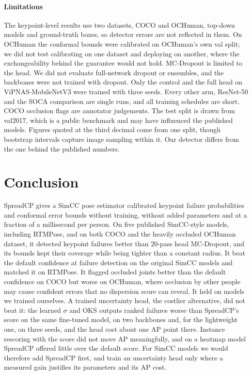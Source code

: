 \documentclass[preprint,11pt]{elsarticle}
\newcommand{\method}{SpreadCP}
\begin{document}
\paragraph{Limitations} The keypoint-level results use two datasets, COCO and OCHuman, top-down models
and ground-truth boxes, so detector errors are not reflected in them. On OCHuman the conformal bounds
were calibrated on OCHuman's own val split; we did not test calibrating on one dataset and deploying
on another, where the exchangeability behind the guarantee would not hold. MC-Dropout is limited to the head.
We did not evaluate full-network dropout or ensembles, and the backbones were not trained with
dropout. Only the control and the full head on ViPNAS-MobileNetV3 were trained with three seeds. Every
other arm, ResNet-50 and the SOCA comparison are single runs, and all training schedules are short.
COCO occlusion flags are annotator judgements. The test split is drawn from val2017, which
is a public benchmark and may have influenced the published models. Figures quoted at the third decimal
come from one split, though bootstrap intervals capture image sampling within it. Our detector differs
from the one behind the published numbers.

\section{Conclusion}

\method{} gives a SimCC pose estimator calibrated keypoint failure probabilities and conformal error
bounds without training, without added parameters and at a fraction of a millisecond per person. On
five published SimCC-style models, including RTMPose, and on both COCO and the heavily occluded OCHuman
dataset, it detected keypoint failures better than 20-pass head MC-Dropout, and its bounds kept their
coverage while being tighter than a constant radius. It beat the default confidence at failure
detection on the original SimCC models and matched it on RTMPose. It flagged occluded joints better than
the default confidence on COCO but worse on OCHuman, where occlusion by other people may cause confident
errors that no dispersion score can reveal. It held on models we trained ourselves. A trained uncertainty head, the costlier alternative, did not beat it: the learned
$\sigma$ and OKS outputs ranked failures worse than \method{}'s score on the same fine-tuned model, on two
backbones and, for the lightweight one, on three seeds, and the head cost about one AP point there.
Instance rescoring with the score did not move AP meaningfully, and on a heatmap model \method{} offered
little over the default score. For SimCC models we would therefore add \method{} first, and train an
uncertainty head only where a measured gain justifies its parameters and its AP cost.
\end{document}
